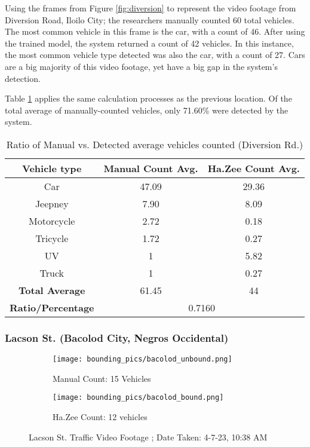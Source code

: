 Using the frames from Figure \ref{fig:diversion} to represent the video footage from Diversion Road, Iloilo City; the researchers manually counted 60 total vehicles. The most common vehicle in this frame is the car, with a count of 46. After using the trained model, the system returned a count of 42 vehicles. In this instance, the most common vehicle type detected was also the car, with a count of 27. Cars are a big majority of this video footage, yet have a big gap in the system’s detection.

Table \ref{tab:diversion_rd} applies the same calculation processes as the previous location. Of the total average of manually-counted vehicles, only 71.60\% were detected by the system. 




\begin{table}[ht]   %
	\centering
	\caption{Ratio of Manual vs. Detected average vehicles counted  (Diversion Rd.)} \vspace{0.25em}
	\begin{tabular}{c|c|c} \hline
		\centering \textbf {Vehicle type}& \textbf{Manual Count Avg.} & \textbf{Ha.Zee Count Avg.}\\ \hline
		Car & 47.09 & 29.36   \\ 
		Jeepney & 7.90 & 8.09 	\\ 
		Motorcycle& 2.72  & 0.18  \\ 
		Tricycle   & 1.72  & 0.27  \\ 
		UV & 1 & 5.82  \\ 
		Truck & 1 & 0.27 \\ \hline
		
		\textbf{Total Average} & 61.45 & 44\\ \hline
		
		\textbf{Ratio/Percentage} & \multicolumn{2}{c}{0.7160}  \\ \hline
		
	\end{tabular}
	\label{tab:diversion_rd}
\end{table}



\subsubsection{Lacson St. (Bacolod City, Negros Occidental)
}


\begin{figure}[!htbp]
	\begin{subfigure}{.5\textwidth}
		\centering
		\texttt{[image: bounding\_pics/bacolod\_unbound.png]}
		\caption{Manual Count: 15 Vehicles}
		
	\end{subfigure}%
	\begin{subfigure}{.5\textwidth}
		\centering
		\texttt{[image: bounding\_pics/bacolod\_bound.png]}
		\caption{Ha.Zee Count: 12 vehicles}
	\end{subfigure}
	\caption{Lacson St. Traffic Video Footage ; Date Taken: 4-7-23, 10:38 AM}
	\label{fig:lacson}
\end{figure}
\FloatBarrier

